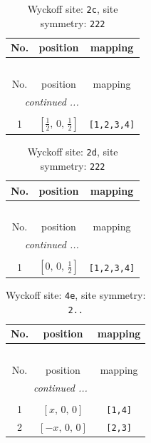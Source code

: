 \documentclass[fleqn,8pt]{jsarticle}
\begin{document}
\begin{longtable}{ccc}
\caption{Wyckoff site: {\tt 2c}, site symmetry: {\tt 222}}
 \\
 \hline \hline
No. & position & mapping \\ \hline \endfirsthead

\multicolumn{2}{l}{\tablename\ \thetable{}} \\
 \hline \hline
No. & position & mapping \\ \hline \endhead

 \hline \hline
\multicolumn{2}{r}{\footnotesize\it continued ...} \\ \endfoot

 \hline \hline
\multicolumn{2}{r}{} \\ \endlastfoot

1 & $\left[ \frac{1}{2},\, 0,\, \frac{1}{2} \right]$ & {\tt [1,2,3,4]} \\
\end{longtable}
\renewcommand{\arraystretch}{1.2}
\begin{longtable}{ccc}
\caption{Wyckoff site: {\tt 2d}, site symmetry: {\tt 222}}
 \\
 \hline \hline
No. & position & mapping \\ \hline \endfirsthead

\multicolumn{2}{l}{\tablename\ \thetable{}} \\
 \hline \hline
No. & position & mapping \\ \hline \endhead

 \hline \hline
\multicolumn{2}{r}{\footnotesize\it continued ...} \\ \endfoot

 \hline \hline
\multicolumn{2}{r}{} \\ \endlastfoot

1 & $\left[ 0,\, 0,\, \frac{1}{2} \right]$ & {\tt [1,2,3,4]} \\
\end{longtable}
\renewcommand{\arraystretch}{1.2}
\begin{longtable}{ccc}
\caption{Wyckoff site: {\tt 4e}, site symmetry: {\tt 2..}}
 \\
 \hline \hline
No. & position & mapping \\ \hline \endfirsthead

\multicolumn{2}{l}{\tablename\ \thetable{}} \\
 \hline \hline
No. & position & mapping \\ \hline \endhead

 \hline \hline
\multicolumn{2}{r}{\footnotesize\it continued ...} \\ \endfoot

 \hline \hline
\multicolumn{2}{r}{} \\ \endlastfoot

1 & $\left[ x,\, 0,\, 0 \right]$ & {\tt [1,4]} \\ \hline
2 & $\left[ - x,\, 0,\, 0 \right]$ & {\tt [2,3]} \\
\end{longtable}
\end{document}
